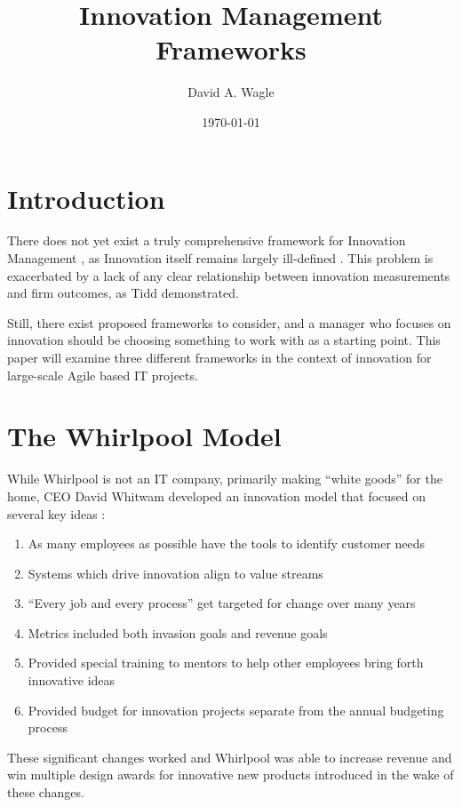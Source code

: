 \documentclass[man]{apa7}
\affiliation{North Central University}
\author{David A. Wagle}
\date{\today}
\title{Innovation Management Frameworks}
\begin{document}
\maketitle


\section{Introduction}
\label{sec:orgd454238}

There does not yet exist a truly comprehensive framework for Innovation Management \parencite{tiddInnovationManagementContext2001}, as Innovation itself remains largely ill-defined \parencite[p. 235]{godinInnovationContestedIdea2015}. This problem is exacerbated by a lack of any clear relationship between innovation measurements and firm outcomes, as Tidd demonstrated.

Still, there exist proposed frameworks to consider, and a manager who focuses on innovation should be choosing something to work with as a starting point. This paper will examine three different frameworks in the context of innovation for large-scale Agile based IT projects. 

\section{The Whirlpool Model}
\label{sec:org23fcf60}

While Whirlpool is not an IT company, primarily making ``white goods'' for the home, CEO David Whitwam developed an innovation model that focused on several key ideas \parencite{dayChangingWorkInnovation2020} :

\begin{enumerate}
\item As many employees as possible have the tools to identify customer needs
\item Systems which drive innovation align to value streams
\item ``Every job and every process'' get targeted for change over many years
\item Metrics included both invasion goals and revenue goals
\item Provided special training to mentors to help other employees bring forth innovative ideas
\item Provided budget for innovation projects separate from the annual budgeting process
\end{enumerate}

These significant changes worked and Whirlpool was able to increase revenue and win multiple design awards for innovative new products introduced in the wake of these changes.
\end{document}

